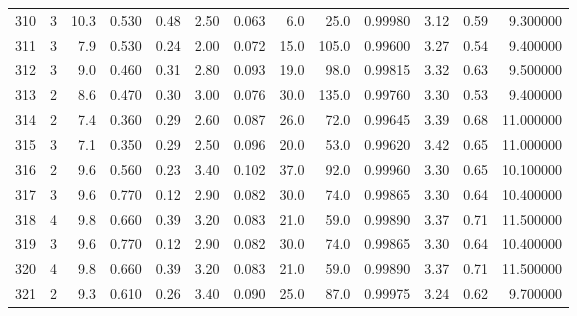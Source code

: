 \begin{tabular}{lrrrrrrrrrrrr}
310  &        3 &           10.3 &             0.530 &         0.48 &            2.50 &      0.063 &                  6.0 &                  25.0 &  0.99980 &  3.12 &       0.59 &   9.300000 \\
311  &        3 &            7.9 &             0.530 &         0.24 &            2.00 &      0.072 &                 15.0 &                 105.0 &  0.99600 &  3.27 &       0.54 &   9.400000 \\
312  &        3 &            9.0 &             0.460 &         0.31 &            2.80 &      0.093 &                 19.0 &                  98.0 &  0.99815 &  3.32 &       0.63 &   9.500000 \\
313  &        2 &            8.6 &             0.470 &         0.30 &            3.00 &      0.076 &                 30.0 &                 135.0 &  0.99760 &  3.30 &       0.53 &   9.400000 \\
314  &        2 &            7.4 &             0.360 &         0.29 &            2.60 &      0.087 &                 26.0 &                  72.0 &  0.99645 &  3.39 &       0.68 &  11.000000 \\
315  &        3 &            7.1 &             0.350 &         0.29 &            2.50 &      0.096 &                 20.0 &                  53.0 &  0.99620 &  3.42 &       0.65 &  11.000000 \\
316  &        2 &            9.6 &             0.560 &         0.23 &            3.40 &      0.102 &                 37.0 &                  92.0 &  0.99960 &  3.30 &       0.65 &  10.100000 \\
317  &        3 &            9.6 &             0.770 &         0.12 &            2.90 &      0.082 &                 30.0 &                  74.0 &  0.99865 &  3.30 &       0.64 &  10.400000 \\
318  &        4 &            9.8 &             0.660 &         0.39 &            3.20 &      0.083 &                 21.0 &                  59.0 &  0.99890 &  3.37 &       0.71 &  11.500000 \\
319  &        3 &            9.6 &             0.770 &         0.12 &            2.90 &      0.082 &                 30.0 &                  74.0 &  0.99865 &  3.30 &       0.64 &  10.400000 \\
320  &        4 &            9.8 &             0.660 &         0.39 &            3.20 &      0.083 &                 21.0 &                  59.0 &  0.99890 &  3.37 &       0.71 &  11.500000 \\
321  &        2 &            9.3 &             0.610 &         0.26 &            3.40 &      0.090 &                 25.0 &                  87.0 &  0.99975 &  3.24 &       0.62 &   9.700000 \\

\end{tabular}
